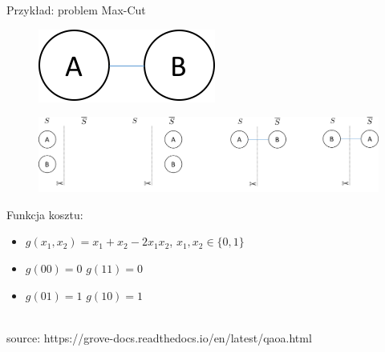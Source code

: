 	\begin{frame}{Przykład: problem Max-Cut}
 \begin{figure}
\includegraphics[scale=0.3]{img/18/barbell.png}
\end{figure} 
\begin{figure}
\includegraphics[scale=0.18]{img/18/partition_barbell.png}
\end{figure} 
Funkcja kosztu:
    \begin{itemize}
        \item[] $g(x_1, x_2)=x_1+x_2-2x_1 x_2$, $x_1,x_2 \in\{0,1\}$
        \item[] $g(00)=0$ $g(11)=0$
        \item[] $g(01)=1$ $g(10)=1$
    \end{itemize}
    \\
    \small{source: https://grove-docs.readthedocs.io/en/latest/qaoa.html}
\end{frame}

